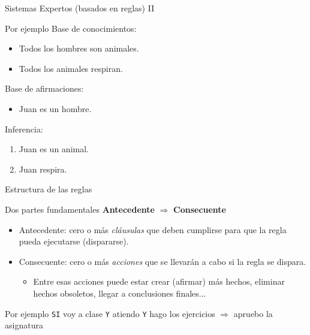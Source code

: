 \documentclass[usenames,dvipsnames,aspectratio=169]{beamer}
\begin{document}
\begin{frame}{Sistemas Expertos (basados en reglas) II}
	\begin{exampleblock}{Por ejemplo}
		Base de conocimientos:
		\begin{itemize}
			\item Todos los hombres son animales.
			\item Todos los animales respiran.
		\end{itemize}
		Base de afirmaciones:
		\begin{itemize}
			\item Juan es un hombre.
		\end{itemize}
		Inferencia:
		\begin{enumerate}
			\item Juan es un animal.
			\item Juan respira.
		\end{enumerate}
	\end{exampleblock}
\end{frame}

\begin{frame}{Estructura de las reglas}
	\begin{block}{Dos partes fundamentales}
		\centering
		\textbf{Antecedente} $\Longrightarrow$ \textbf{Consecuente}
	\end{block}
	\begin{itemize}
		\item Antecedente: cero o más \textit{cláusulas} que deben cumplirse para que la regla pueda ejecutarse (dispararse).
		\item Consecuente: cero o más \textit{acciones} que se llevarán a cabo si la regla se dispara.
		\begin{itemize}
			\item Entre esas acciones puede estar crear (afirmar) más hechos, eliminar hechos obsoletos, llegar a conclusiones finales...
		\end{itemize}
	\end{itemize}
	\begin{exampleblock}{Por ejemplo}
		\centering
		\texttt{SI} voy a clase \texttt{Y} atiendo \texttt{Y} hago los ejercicios $\Longrightarrow$ apruebo la asignatura
	\end{exampleblock}
\end{frame}
\end{document}
